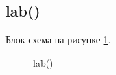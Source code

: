 \subsection{lab()}

Блок-схема на рисунке \ref{fig:lab}.

\begin{figure}[h]
    \caption{lab()}
    \label{fig:lab}
\end{figure}





\newpage